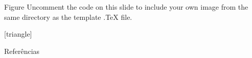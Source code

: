 \documentclass[aspectratio=169,xcolor=dvipsnames]{beamer}
\begin{document}
\begin{frame}{Figure}
    Uncomment the code on this slide to include your own image from the same directory as the template .TeX file.
\end{frame}

\nocite{*}

[triangle]
\begin{frame}[shrink=16]{Referências}
    \footnotesize
    
    
\end{frame}
\end{document}
